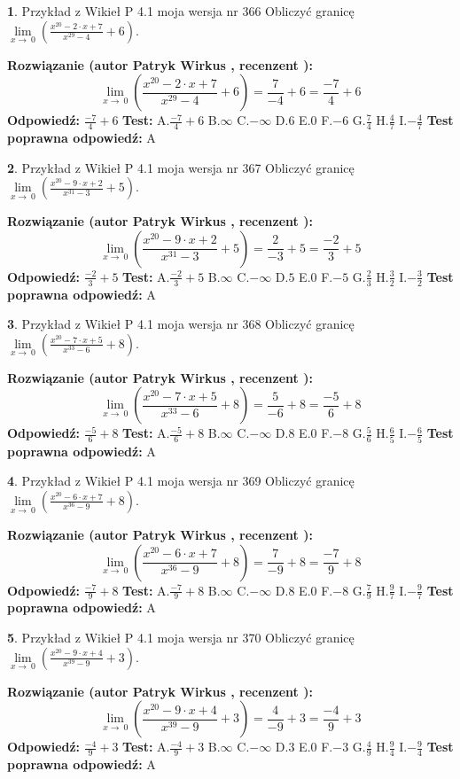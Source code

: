 \documentclass[12pt, a4paper]{article}
\theoremstyle{definition} %
\newtheorem{zad}{}
\newcommand{\zadStart}[1]{\begin{zad}#1\newline}
\newcommand{\zadStop}{\end{zad}}
\newcommand{\rozwStart}[2]{\noindent \textbf{Rozwiązanie (autor #1 , recenzent #2): }\newline}
\newcommand{\rozwStop}{\newline}
\newcommand{\odpStart}{\noindent \textbf{Odpowiedź:}\newline}
\newcommand{\odpStop}{\newline}
\newcommand{\testStart}{\noindent \textbf{Test:}\newline}
\newcommand{\testStop}{\newline}
\newcommand{\kluczStart}{\noindent \textbf{Test poprawna odpowiedź:}\newline}
\newcommand{\kluczStop}{\newline}
\begin{document}
\zadStart{Przykład z Wikieł P 4.1 moja wersja nr 366}
Obliczyć granicę $\lim\limits_{x\to\ 0}(\frac{x^{20}-2 \cdot x +7}{x^{29}-4}+6)$.
\zadStop
\rozwStart{Patryk Wirkus}{}
$$\lim\limits_{x\to\ 0}(\frac{x^{20}-2 \cdot x +7}{x^{29}-4}+6)=\frac{7}{-4}+6=\frac{-7}{4}+6$$
\rozwStop
\odpStart
$\frac{-7}{4}+6$
\odpStop
\testStart
A.$\frac{-7}{4}+6$
B.$\infty$
C.$-\infty$
D.$6$
E.$0$
F.$-6$
G.$\frac{7}{4}$
H.$\frac{4}{7}$
I.$-\frac{4}{7}$
\testStop
\kluczStart
A
\kluczStop



\zadStart{Przykład z Wikieł P 4.1 moja wersja nr 367}
Obliczyć granicę $\lim\limits_{x\to\ 0}(\frac{x^{20}-9 \cdot x +2}{x^{31}-3}+5)$.
\zadStop
\rozwStart{Patryk Wirkus}{}
$$\lim\limits_{x\to\ 0}(\frac{x^{20}-9 \cdot x +2}{x^{31}-3}+5)=\frac{2}{-3}+5=\frac{-2}{3}+5$$
\rozwStop
\odpStart
$\frac{-2}{3}+5$
\odpStop
\testStart
A.$\frac{-2}{3}+5$
B.$\infty$
C.$-\infty$
D.$5$
E.$0$
F.$-5$
G.$\frac{2}{3}$
H.$\frac{3}{2}$
I.$-\frac{3}{2}$
\testStop
\kluczStart
A
\kluczStop



\zadStart{Przykład z Wikieł P 4.1 moja wersja nr 368}
Obliczyć granicę $\lim\limits_{x\to\ 0}(\frac{x^{20}-7 \cdot x +5}{x^{33}-6}+8)$.
\zadStop
\rozwStart{Patryk Wirkus}{}
$$\lim\limits_{x\to\ 0}(\frac{x^{20}-7 \cdot x +5}{x^{33}-6}+8)=\frac{5}{-6}+8=\frac{-5}{6}+8$$
\rozwStop
\odpStart
$\frac{-5}{6}+8$
\odpStop
\testStart
A.$\frac{-5}{6}+8$
B.$\infty$
C.$-\infty$
D.$8$
E.$0$
F.$-8$
G.$\frac{5}{6}$
H.$\frac{6}{5}$
I.$-\frac{6}{5}$
\testStop
\kluczStart
A
\kluczStop



\zadStart{Przykład z Wikieł P 4.1 moja wersja nr 369}
Obliczyć granicę $\lim\limits_{x\to\ 0}(\frac{x^{20}-6 \cdot x +7}{x^{36}-9}+8)$.
\zadStop
\rozwStart{Patryk Wirkus}{}
$$\lim\limits_{x\to\ 0}(\frac{x^{20}-6 \cdot x +7}{x^{36}-9}+8)=\frac{7}{-9}+8=\frac{-7}{9}+8$$
\rozwStop
\odpStart
$\frac{-7}{9}+8$
\odpStop
\testStart
A.$\frac{-7}{9}+8$
B.$\infty$
C.$-\infty$
D.$8$
E.$0$
F.$-8$
G.$\frac{7}{9}$
H.$\frac{9}{7}$
I.$-\frac{9}{7}$
\testStop
\kluczStart
A
\kluczStop



\zadStart{Przykład z Wikieł P 4.1 moja wersja nr 370}
Obliczyć granicę $\lim\limits_{x\to\ 0}(\frac{x^{20}-9 \cdot x +4}{x^{39}-9}+3)$.
\zadStop
\rozwStart{Patryk Wirkus}{}
$$\lim\limits_{x\to\ 0}(\frac{x^{20}-9 \cdot x +4}{x^{39}-9}+3)=\frac{4}{-9}+3=\frac{-4}{9}+3$$
\rozwStop
\odpStart
$\frac{-4}{9}+3$
\odpStop
\testStart
A.$\frac{-4}{9}+3$
B.$\infty$
C.$-\infty$
D.$3$
E.$0$
F.$-3$
G.$\frac{4}{9}$
H.$\frac{9}{4}$
I.$-\frac{9}{4}$
\testStop
\kluczStart
A
\kluczStop
\end{document}
